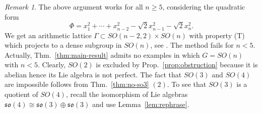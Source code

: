 \documentclass[11pt, letterpaper, oneside,reqno]{amsart}
\theoremstyle{plain}
\theoremstyle{underline}
\theoremstyle{definition}
\theoremstyle{remark}
\newtheorem{remark}[thm]{Remark}
\begin{document}
	
	\begin{remark}
		The above argument works for all $n\geq 5$, considering the quadratic form
		\[
		\Phi=x_1^{2}+\cdots+x_{n-2}^{2}-\sqrt{2}x_{n-1}^{2}-\sqrt{2}x_{n}^{2}.
		\]
		We get an arithmetic lattice $\Gamma\subset SO(n-2,2)\times SO(n)$ with property (T) which projects to a dense subgroup in $SO(n)$, see \cite[Prop.~3.4.3]{Lubotzky}.
		The method fails for $n<5$. Actually, Thm.~\ref{thm:main-result} admits no examples in which $G=SO(n)$ with $n<5$. Clearly, $SO(2)$ is excluded by Prop.~\ref{prop:obstruction} because it is abelian hence its Lie algebra is not perfect. The fact that $SO(3)$ and $SO(4)$ are impossible follows from Thm.~\ref{thm:no-so3} $(2)$. To see that $SO(3)$ is a quotient of $SO(4)$, recall the isomorphism of Lie algebras $\mathfrak{so}(4)\cong\mathfrak{so}(3)\oplus\mathfrak{so}(3)$ and use Lemma~\ref{lem:rephrase}.
		
	\end{remark}
	
	
	
	
	
	
	
\end{document}
